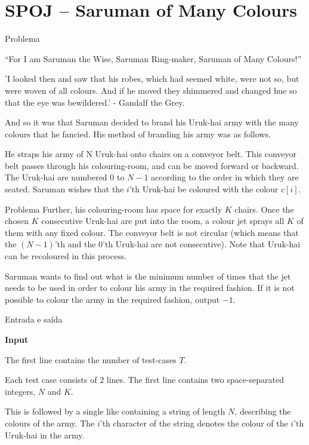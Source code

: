 \section{SPOJ -- Saruman of Many Colours}

\begin{frame}[fragile]{Problema}


``For I am Saruman the Wise, Saruman Ring-maker, Saruman of Many Colours!''

'I looked then and saw that his robes, which had seemed white, were not so, but were woven of all colours. And if he moved they shimmered and changed hue so that the eye was bewildered.' - Gandalf the Grey.

And so it was that Saruman decided to brand his Uruk-hai army with the many colours that he fancied. His method of branding his army was as follows.

He straps his army of N Uruk-hai onto chairs on a conveyor belt. This conveyor belt passes through his colouring-room, and can be moved forward or backward. The Uruk-hai are numbered $0$ to $N-1$ according to the order in which they are seated. Saruman wishes that the $i$'th Uruk-hai be coloured with the colour $c[i]$.
\end{frame}

\begin{frame}[fragile]{Problema}
Further, his colouring-room has space for exactly $K$ chairs. Once the chosen $K$ consecutive Uruk-hai are put into the room, a colour jet sprays all $K$ of them with any fixed colour. The conveyor belt is not circular (which means that the $(N-1)$'th and the $0$'th Uruk-hai are not consecutive). Note that Uruk-hai can be recoloured in this process.

Saruman wants to find out what is the minimum number of times that the jet needs to be used in order to colour his army in the required fashion. If it is not possible to colour the army in the required fashion, output $-1$.
\end{frame}

\begin{frame}[fragile]{Entrada e saída}

\textbf{Input}

The first line contains the number of test-cases $T$.

Each test case consists of $2$ lines. The first line contains two space-separated integers, $N$ and $K$.

This is followed by a single like containing a string of length $N$, describing the colours of the army. The $i$'th character of the string denotes the colour of the $i$'th Uruk-hai in the army.
\end{frame}

